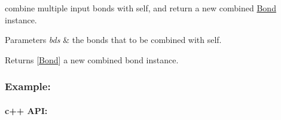 combine multiple input bonds with self, and return a new combined \hyperlink{classcytnx_1_1Bond}{Bond} instance. 


\begin{DoxyParams}{Parameters}
{\em bds} & the bonds that to be combined with self. \\
\hline
\end{DoxyParams}
\begin{DoxyReturn}{Returns}
\mbox{[}\hyperlink{classcytnx_1_1Bond}{Bond}\mbox{]} a new combined bond instance.
\end{DoxyReturn}
\subsubsection*{Example\+:}

\paragraph*{c++ A\+PI\+:}


